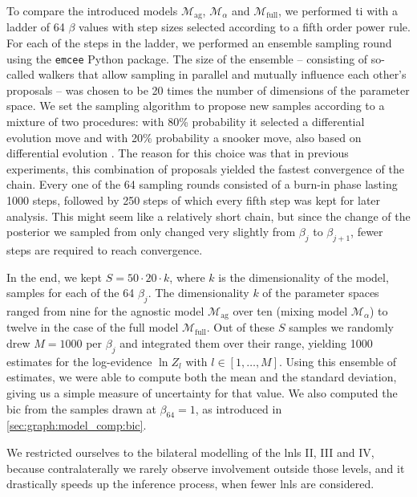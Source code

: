 \documentclass[\relativeRoot/main.tex]{subfiles}
\begin{document}
To compare the introduced models $\mathcal{M}_\text{ag}$, $\mathcal{M}_\alpha$ and $\mathcal{M}_\text{full}$, we performed \gls{ti} with a ladder of 64 $\beta$ values with step sizes selected according to a fifth order power rule. For each of the steps in the ladder, we performed an ensemble sampling round using the \texttt{emcee} \cite{foreman-mackey_emcee_2013} Python package. The size of the ensemble -- consisting of so-called walkers that allow sampling in parallel and mutually influence each other's proposals -- was chosen to be 20 times the number of dimensions of the parameter space. We set the sampling algorithm to propose new samples according to a mixture of two procedures: with 80\% probability it selected a differential evolution move \cite{nelson_run_2013} and with 20\% probability a snooker move, also based on differential evolution \cite{ter_braak_differential_2008}. The reason for this choice was that in previous experiments, this combination of proposals yielded the fastest convergence of the chain. Every one of the 64 sampling rounds consisted of a burn-in phase lasting 1000 steps, followed by 250 steps of which every fifth step was kept for later analysis. This might seem like a relatively short chain, but since the change of the posterior we sampled from only changed very slightly from $\beta_j$ to $\beta_{j+1}$, fewer steps are required to reach convergence.

In the end, we kept $S = 50 \cdot 20 \cdot k$, where $k$ is the dimensionality of the model, samples for each of the 64 $\beta_j$. The dimensionality $k$ of the parameter spaces ranged from nine for the agnostic model $\mathcal{M}_\text{ag}$ over ten (mixing model $\mathcal{M}_\alpha$) to twelve in the case of the full model $\mathcal{M}_\text{full}$. Out of these $S$ samples we randomly drew $M = 1000$ per $\beta_j$ and integrated them over their range, yielding 1000 estimates for the log-evidence $\ln{Z}_l$ with $l \in [1, \ldots, M]$. Using this ensemble of estimates, we were able to compute both the mean and the standard deviation, giving us a simple measure of uncertainty for that value. We also computed the \gls{bic} from the samples drawn at $\beta_{64} = 1$, as introduced in \cref{sec:graph:model_comp:bic}.

We restricted ourselves to the bilateral modelling of the \glspl{lnl} II, III and IV, because contralaterally we rarely observe involvement outside those levels, and it drastically speeds up the inference process, when fewer \glspl{lnl} are considered.
\end{document}
